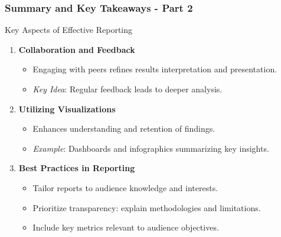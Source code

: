 \documentclass{beamer}
\begin{document}
\begin{frame}[fragile]
    \frametitle{Summary and Key Takeaways - Part 2}
    
    \begin{block}{Key Aspects of Effective Reporting}
        \begin{enumerate}
            \item \textbf{Collaboration and Feedback}
            \begin{itemize}
                \item Engaging with peers refines results interpretation and presentation.
                \item \textit{Key Idea}: Regular feedback leads to deeper analysis.
            \end{itemize}

            \item \textbf{Utilizing Visualizations}
            \begin{itemize}
                \item Enhances understanding and retention of findings.
                \item \textit{Example}: Dashboards and infographics summarizing key insights.
            \end{itemize}

            \item \textbf{Best Practices in Reporting}
            \begin{itemize}
                \item Tailor reports to audience knowledge and interests.
                \item Prioritize transparency: explain methodologies and limitations.
                \item Include key metrics relevant to audience objectives.
            \end{itemize}
        \end{enumerate}
    \end{block}
\end{frame}
\end{document}
